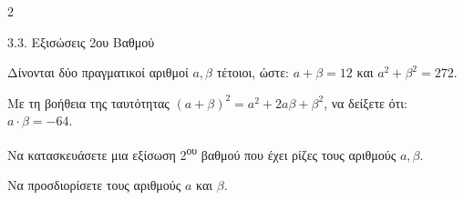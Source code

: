 \begin{ylh}{2}
    \item 3.3. Εξισώσεις 2ου Βαθμού
\end{ylh}
Δίνονται δύο πραγματικοί αριθμοί $a, \beta$ τέτοιοι, ώστε: $a + \beta = 12$ και $a^2 + \beta^2 = 272$.
\begin{alist}
\item Με τη βοήθεια της ταυτότητας $(a + \beta)^2 = a^2 + 2a\beta + \beta^2$, να δείξετε ότι: $a \cdot \beta = -64$. 
\item Να κατασκευάσετε μια εξίσωση 2\textsuperscript{ου} βαθμού που έχει ρίζες τους αριθμούς $a, \beta$. 
\item Να προσδιορίσετε τους αριθμούς $a$ και $\beta$. 
\end{alist}

